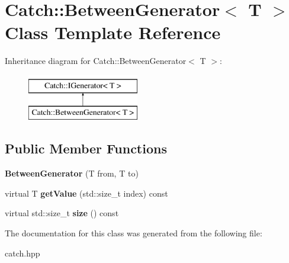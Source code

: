 \hypertarget{classCatch_1_1BetweenGenerator}{}\section{Catch\+:\+:Between\+Generator$<$ T $>$ Class Template Reference}
\label{classCatch_1_1BetweenGenerator}
Inheritance diagram for Catch\+:\+:Between\+Generator$<$ T $>$\+:\begin{figure}[H]
\begin{center}
\leavevmode
\includegraphics[height=2.000000cm]{classCatch_1_1BetweenGenerator}
\end{center}
\end{figure}
\subsection*{Public Member Functions}
\begin{DoxyCompactItemize}
\item 
\mbox{\label{classCatch_1_1BetweenGenerator_a835a057d691ae37caef660624099b51c}} 
{\bfseries Between\+Generator} (T from, T to)
\item 
\mbox{\label{classCatch_1_1BetweenGenerator_a913f74bb0c23b3bc0127abfffdabbd94}} 
virtual T {\bfseries get\+Value} (std\+::size\+\_\+t index) const
\item 
\mbox{\label{classCatch_1_1BetweenGenerator_af65a1fe51f9b1106fc676e3dd189adb6}} 
virtual std\+::size\+\_\+t {\bfseries size} () const
\end{DoxyCompactItemize}


The documentation for this class was generated from the following file\+:\begin{DoxyCompactItemize}
\item 
catch.\+hpp\end{DoxyCompactItemize}
